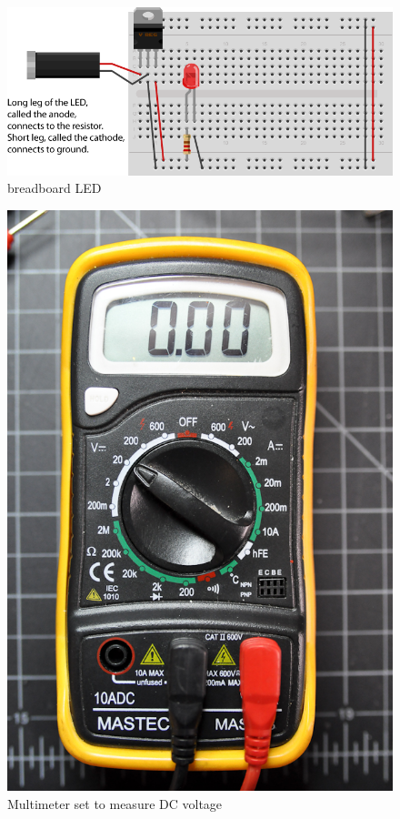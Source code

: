 \begin{figure}[!htb]
 \centering
 \includegraphics[scale=0.8]{img/electronics/breadboard_LED.png}
 \caption{breadboard LED}
 \label{breadboard LED}
\end{figure}

\begin{figure}[!htb]
 \centering
 \includegraphics[scale=0.3]{img/electronics/multimeter_voltage.jpg}
 \caption{Multimeter set to measure DC voltage}
 \label{Multimeter set to measure DC voltage}
\end{figure}

